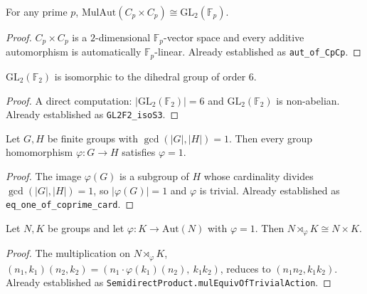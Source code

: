 \begin{lemma}
    \label{lem:aut-CpCp}
    For any prime $p$, $\mathrm{MulAut}(C_p \times C_p) \cong
    \mathrm{GL}_2(\mathbb{F}_p)$.
\end{lemma}
\begin{proof}
    $C_p \times C_p$ is a $2$-dimensional $\mathbb{F}_p$-vector space and
    every additive automorphism is automatically $\mathbb{F}_p$-linear.
    Already established as \texttt{aut\_of\_CpCp}.
\end{proof}

\begin{lemma}
    \label{lem:GL2F2-isoS3}
    $\mathrm{GL}_2(\mathbb{F}_2)$ is isomorphic to the dihedral group of order
    $6$.
\end{lemma}
\begin{proof}
    A direct computation: $|\mathrm{GL}_2(\mathbb{F}_2)| = 6$ and
    $\mathrm{GL}_2(\mathbb{F}_2)$ is non-abelian. Already established as
    \texttt{GL2F2\_isoS3}.
\end{proof}

\begin{lemma}
    \label{lem:eq-one-of-coprime-card}
    Let $G, H$ be finite groups with $\gcd(|G|, |H|) = 1$. Then every group
    homomorphism $\varphi : G \to H$ satisfies $\varphi = 1$.
\end{lemma}
\begin{proof}
    The image $\varphi(G)$ is a subgroup of $H$ whose cardinality divides
    $\gcd(|G|,|H|) = 1$, so $|\varphi(G)| = 1$ and $\varphi$ is trivial.
    Already established as \texttt{eq\_one\_of\_coprime\_card}.
\end{proof}

\begin{lemma}
    \label{lem:sdp-trivial-action}
    Let $N, K$ be groups and let $\varphi : K \to \mathrm{Aut}(N)$ with
    $\varphi = 1$. Then $N \rtimes_\varphi K \cong N \times K$.
\end{lemma}
\begin{proof}
    The multiplication on $N \rtimes_\varphi K$,
    $(n_1, k_1)(n_2, k_2) = (n_1 \cdot \varphi(k_1)(n_2),\ k_1 k_2)$,
    reduces to $(n_1 n_2, k_1 k_2)$. Already established as
    \texttt{SemidirectProduct.mulEquivOfTrivialAction}.
\end{proof}

